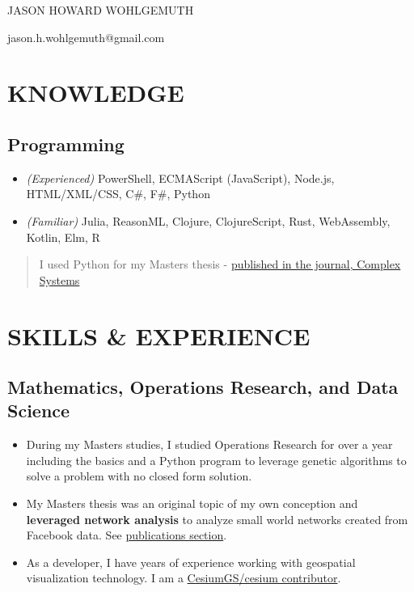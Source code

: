 \documentclass[10pt]{article}
\def\tightlist{}
\begin{document}
\begin{center}\Huge {JASON HOWARD WOHLGEMUTH}\end{center}
\begin{center}jason.h.wohlgemuth@gmail.com\end{center}

\hypertarget{knowledge}{%
\section{KNOWLEDGE}\label{knowledge}}

\hypertarget{programming}{%
\subsection{Programming}\label{programming}}

\begin{itemize}
\tightlist
\item
  \emph{(Experienced)} PowerShell, ECMAScript (JavaScript), Node.js,
  HTML/XML/CSS, C\#, F\#, Python
\item
  \emph{(Familiar)} Julia, ReasonML, Clojure, ClojureScript, Rust,
  WebAssembly, Kotlin, Elm, R
\end{itemize}

\begin{quote}
I used Python for my Masters thesis -
\href{https://www.complex-systems.com/abstracts/v23_i03_a01/}{published
in the journal, Complex Systems}
\end{quote}

\hypertarget{skills-experience}{%
\section{SKILLS \& EXPERIENCE}\label{skills-experience}}

\hypertarget{mathematics-operations-research-and-data-science}{%
\subsection{Mathematics, Operations Research, and Data
Science}\label{mathematics-operations-research-and-data-science}}

\begin{itemize}
\tightlist
\item
  During my Masters studies, I studied Operations Research for over a
  year including the basics and a Python program to leverage genetic
  algorithms to solve a problem with no closed form solution.
\item
  My Masters thesis was an original topic of my own conception and
  \textbf{leveraged network analysis} to analyze small world networks
  created from Facebook data. See
  \protect\hyperlink{publications-citations}{publications section}.
\item
  As a developer, I have years of experience working with geospatial
  visualization technology. I am a
  \href{https://github.com/CesiumGS/cesium/blob/main/CONTRIBUTORS.md}{CesiumGS/cesium
  contributor}.
\end{itemize}
\end{document}
